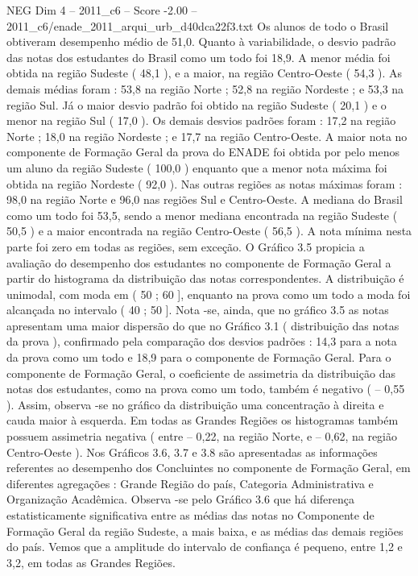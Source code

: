 \begin{textsample}{NEG Dim 4 – 2011\_c6 – Score -2.00 – 2011\_c6/enade\_2011\_arqui\_urb\_d40dca22f3.txt}
Os alunos de todo o Brasil obtiveram desempenho médio de 51,0.
Quanto à variabilidade, o desvio padrão das notas dos estudantes do Brasil como um todo foi 18,9.
A menor média foi obtida na região Sudeste ( 48,1 ), e a maior, na região Centro-Oeste ( 54,3 ).
As demais médias foram : 53,8 na região Norte ; 52,8 na região Nordeste ; e 53,3 na região Sul.
Já o maior desvio padrão foi obtido na região Sudeste ( 20,1 ) e o menor na região Sul ( 17,0 ).
Os demais desvios padrões foram : 17,2 na região Norte ; 18,0 na região Nordeste ; e 17,7 na região Centro-Oeste.
A maior nota no componente de Formação Geral da prova do ENADE foi obtida por pelo menos um aluno da região Sudeste ( 100,0 ) enquanto que a menor nota máxima foi obtida na região Nordeste ( 92,0 ).
Nas outras regiões as notas máximas foram : 98,0 na região Norte e 96,0 nas regiões Sul e Centro-Oeste.
A mediana do Brasil como um todo foi 53,5, sendo a menor mediana encontrada na região Sudeste ( 50,5 ) e a maior encontrada na região Centro-Oeste ( 56,5 ).
A nota mínima nesta parte foi zero em todas as regiões, sem exceção.
O Gráfico 3.5 propicia a avaliação do desempenho dos estudantes no componente de Formação Geral a partir do histograma da distribuição das notas correspondentes.
A distribuição é unimodal, com moda em ( 50 ; 60 ], enquanto na prova como um todo a moda foi alcançada no intervalo ( 40 ; 50 ].
Nota -se, ainda, que no gráfico 3.5 as notas apresentam uma maior dispersão do que no Gráfico 3.1 ( distribuição das notas da prova ), confirmado pela comparação dos desvios padrões : 14,3 para a nota da prova como um todo e 18,9 para o componente de Formação Geral.
Para o componente de Formação Geral, o coeficiente de assimetria da distribuição das notas dos estudantes, como na prova como um todo, também é negativo ( – 0,55 ).
Assim, observa -se no gráfico da distribuição uma concentração à direita e cauda maior à esquerda.
Em todas as Grandes Regiões os histogramas também possuem assimetria negativa ( entre – 0,22, na região Norte, e – 0,62, na região Centro-Oeste ).
Nos Gráficos 3.6, 3.7 e 3.8 são apresentadas as informações referentes ao desempenho dos Concluintes no componente de Formação Geral, em diferentes agregações : Grande Região do país, Categoria Administrativa e Organização Acadêmica.
Observa -se pelo Gráfico 3.6 que há diferença estatisticamente significativa entre as médias das notas no Componente de Formação Geral da região Sudeste, a mais baixa, e as médias das demais regiões do país.
Vemos que a amplitude do intervalo de confiança é pequeno, entre 1,2 e 3,2, em todas as Grandes Regiões.

\end{textsample}
